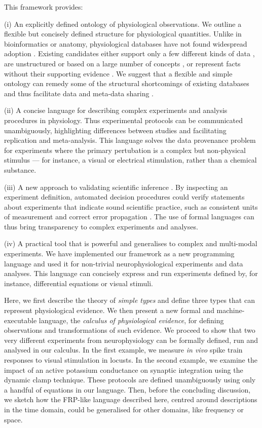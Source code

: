 This framework provides:

(i) An explicitly defined ontology of physiological observations. We
outline a flexible but concisely defined structure for physiological
quantities.  Unlike in bioinformatics or anatomy, physiological
databases have not found widespread adoption \citep{Herz2008,
  Amari2002}. Existing candidates either support only a few different
kinds of data \citep{Jessop2010}, are unstructured \citep{Teeters2008}
or based on a large number of concepts \citep{Frishkoff2009}, or
represent facts without their supporting evidence \citep{Katz2010}.
We suggest that a flexible and simple ontology
can remedy some of the structural shortcomings of existing databases
\citep{Gardner2005, Amari2002} and thus facilitate data and meta-data
sharing \citep{Insel2003}.

(ii) A concise language for describing complex experiments and
analysis procedures in physiology. Thus experimental protocols can be
communicated unambiguously, highlighting differences between studies
and facilitating replication and meta-analysis. This language solves
the data provenance problem \citep{Pool2002} for experiments where the
primary pertubation is a complex but non-physical stimulus --- for
instance, a visual or electrical stimulation, rather than a chemical
substance.

(iii) A new approach to validating scientific inference
\citep{Editors2003, Editors2010, DeSchutter2010}. By inspecting an
experiment definition, automated decision procedures could verify
statements about experiments that indicate sound scientific practice,
such as consistent units of measurement \citep{Kennedy1997} and
correct error propagation \citep{Taylor1997}. The use of formal
languages can thus bring transparency to complex experiments and
analyses.

(iv) A practical tool that is powerful and generalises to complex and
multi-modal experiments. We have implemented our framework as a new
programming language and used it for non-trivial neurophysiological
experiments and data analyses. This language can concisely express and
run experiments defined by, for instance, differential equations or
visual stimuli.

Here, we first describe the theory of \emph{simple types}
\citep{Pierce2002} and define three types that can represent
physiological evidence. We then present a new formal and
machine-executable language, the \emph{calculus of physiological
evidence}, for defining observations and transformations of such
evidence. We proceed to show that two very different experiments from
neurophysiology can be formally defined, run and analysed in our
calculus. In the first example, we measure \emph{in vivo} spike train
responses to visual stimulation in locusts. In the second example, we
examine the impact of an active potassium conductance on synaptic
integration using the dynamic clamp technique. These protocols are
defined unambiguously using only a handful of equations in our
language. Then, before the concluding discussion, we sketch how the FRP-like
language described here, centred around descriptions in the time domain,
could be generalised for other domains, like frequency or space.


